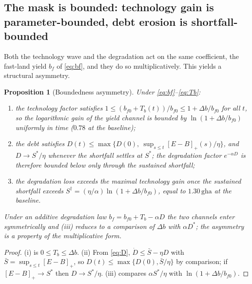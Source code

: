 \documentclass[preprint,12pt,authoryear]{elsarticle}
\newtheorem{proposition}{Proposition}
\newcommand{\pos}[1]{\left[#1\right]_+}
\begin{document}
\subsection{The mask is bounded: technology gain is parameter-bounded, debt erosion is shortfall-bounded}\label{sec:bounded}

Both the technology wave and the degradation act on the same coefficient, the fast-land yield $b_f$ of \eqref{eq:bf}, and they do so multiplicatively. This yields a structural asymmetry.

\begin{proposition}[Boundedness asymmetry]\label{prop:bounded}
Under \eqref{eq:bf}--\eqref{eq:Tb}:
\begin{enumerate}[label=(\roman*)]
\item the technology factor satisfies $1\le(b_{f0}+T_b(t))/b_{f0}\le1+\Delta b/b_{f0}$ for all $t$, so the logarithmic gain of the yield channel is bounded by $\ln(1+\Delta b/b_{f0})$ uniformly in time ($0.78$ at the baseline);
\item the debt satisfies $D(t)\le\max\{D(0),\ \sup_{s\le t}\pos{E-B}(s)/\eta\}$, and $D\to S^*/\eta$ whenever the shortfall settles at $S^*$; the degradation factor $e^{-\alpha D}$ is therefore bounded below only through the sustained shortfall;
\item the degradation loss exceeds the maximal technology gain once the sustained shortfall exceeds $S^\dagger=(\eta/\alpha)\ln(1+\Delta b/b_{f0})$, equal to $1.30\,\mathrm{gha}$ at the baseline.
\end{enumerate}
Under an additive degradation law $b_f=b_{f0}+T_b-\alpha D$ the two channels enter symmetrically and (iii) reduces to a comparison of $\Delta b$ with $\alpha D^*$; the asymmetry is a property of the multiplicative form.
\end{proposition}

\begin{proof}
(i) is $0\le T_b\le\Delta b$. (ii) From \eqref{eq:D}, $\dot D\le\bar S-\eta D$ with $\bar S=\sup_{s\le t}\pos{E-B}$, so $D(t)\le\max\{D(0),\bar S/\eta\}$ by comparison; if $\pos{E-B}\to S^*$ then $D\to S^*/\eta$. (iii) compares $\alpha S^*/\eta$ with $\ln(1+\Delta b/b_{f0})$.
\end{proof}
\end{document}
